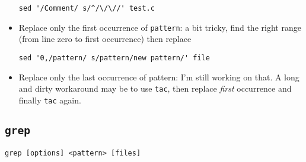 \documentclass[a4paper,12pt,%
              final%
              ]{article}
\begin{document}
\begin{itemize}
\begin{verbatim}
sed '/Comment/ s/^/\/\//' test.c
\end{verbatim}
  \item Replace only the first occurrence of \verb|pattern|: a bit tricky, find the right range (from line zero to first occurrence) then replace
\begin{verbatim}
sed '0,/pattern/ s/pattern/new pattern/' file
\end{verbatim}
  \item Replace only the last occurrence of pattern: I'm still working on that. A long and dirty workaround may be to use \verb|tac|, then replace \emph{first} occurrence and finally \verb|tac| again.
\end{itemize}

\subsection{\texttt{grep}}
\label{ssec:grep}
\verb|grep [options] <pattern> [files]|
\end{document}

